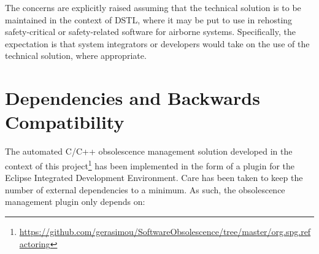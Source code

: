 \documentclass{llncs}
\begin{document}
The concerns are explicitly raised assuming that the technical solution is to be maintained in the context of DSTL, where it
may be put to use in rehosting safety-critical or safety-related software for airborne systems. Specifically, the expectation is that
system integrators or developers would take on the use of the technical solution, where appropriate.

\section{Dependencies and Backwards Compatibility}
The automated C/C++ obsolescence management solution developed in the context of this project\footnote{\url{https://github.com/gerasimou/SoftwareObsolescence/tree/master/org.spg.refactoring}} has been implemented in the form of a plugin for the Eclipse Integrated Development Environment. Care has been taken to keep the number of external dependencies to a minimum. As such, the obsolescence management plugin only depends on:
\end{document}
